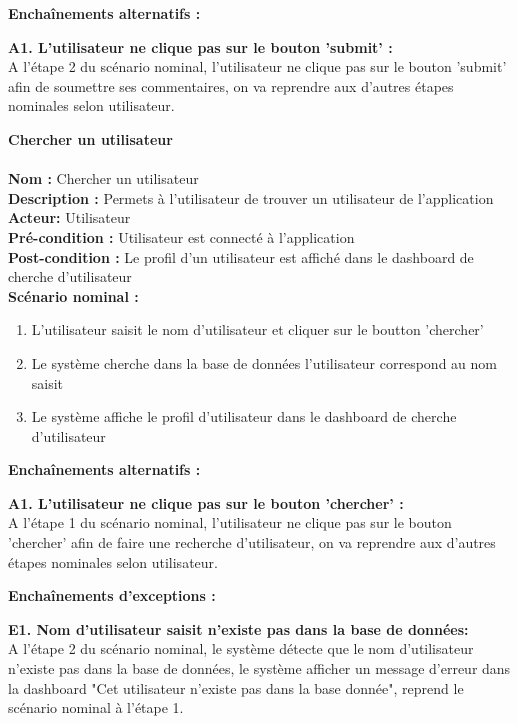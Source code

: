 \documentclass[12pt]{article}
\begin{document}
\textbf{Enchaînements alternatifs : }
\begin{description}
    \item \textbf{A1. L'utilisateur ne clique pas sur le bouton 'submit' : }\\
    A l'étape 2 du scénario nominal, l'utilisateur ne clique pas sur le bouton 'submit' afin de soumettre ses commentaires, on va reprendre aux d'autres étapes nominales selon utilisateur.   
\end{description}


\textbf{Chercher un utilisateur}\\
\leavevmode \\
\textbf{Nom :} Chercher un utilisateur\\
\textbf{Description :} Permets à l'utilisateur de trouver un utilisateur de l'application\\
\textbf{Acteur: } Utilisateur\\
\textbf{Pré-condition : } Utilisateur est connecté à l'application\\
\textbf{Post-condition : } Le profil d'un utilisateur est affiché dans le dashboard de cherche d'utilisateur\\
\textbf{Scénario nominal : }
\begin{enumerate}
    \item L'utilisateur saisit le nom d'utilisateur et cliquer sur le boutton 'chercher'
    \item Le système cherche dans la base de données l'utilisateur correspond au nom saisit
    \item Le système affiche le profil d'utilisateur dans le dashboard de cherche d'utilisateur
\end{enumerate}

\textbf{Enchaînements alternatifs : }
\begin{description}
    \item \textbf{A1. L'utilisateur ne clique pas sur le bouton 'chercher' : }\\
    A l'étape 1 du scénario nominal, l'utilisateur ne clique pas sur le bouton 'chercher' afin de faire une recherche d'utilisateur, on va reprendre aux d'autres étapes nominales selon utilisateur.   
\end{description}

\textbf{Enchaînements d'exceptions : }
\begin{description}
    \item \textbf{E1. Nom d'utilisateur saisit n'existe pas dans la base de données:} \\ 
    A l'étape 2 du scénario nominal, le système détecte que le nom d'utilisateur n'existe pas dans la base de données, le système afficher un message d'erreur dans la dashboard "Cet utilisateur n'existe pas dans la base donnée", reprend le scénario nominal à l'étape 1.
\end{description}
\end{document}
